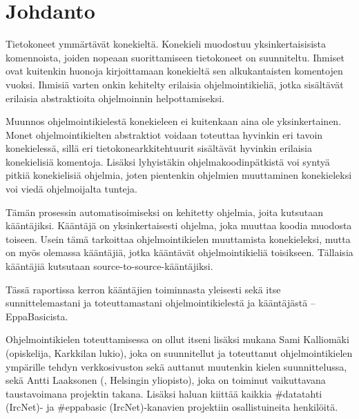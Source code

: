 
\section{Johdanto}
Tietokoneet ymmärtävät konekieltä.
Konekieli muodostuu yksinkertaisisista komennoista,
joiden nopeaan suorittamiseen tietokoneet on suunniteltu.
Ihmiset ovat kuitenkin huonoja kirjoittamaan konekieltä
sen alkukantaisten komentojen vuoksi.
Ihmisiä varten onkin kehitelty erilaisia ohjelmointikieliä,
jotka sisältävät erilaisia abstraktioita ohjelmoinnin helpottamiseksi.

Muunnos ohjelmointikielestä konekieleen ei kuitenkaan aina ole yksinkertainen.
Monet ohjelmointikielten abstraktiot voidaan toteuttaa hyvinkin eri tavoin konekielessä,
sillä eri tietokonearkkitehtuurit sisältävät hyvinkin erilaisia konekielisiä komentoja.
Lisäksi lyhyistäkin ohjelmakoodinpätkistä voi syntyä pitkiä konekielisiä ohjelmia,
joten pientenkin ohjelmien muuttaminen konekieleksi voi viedä ohjelmoijalta tunteja.

Tämän prosessin automatisoimiseksi on kehitetty ohjelmia, joita kutsutaan kääntäjiksi.
Kääntäjä on yksinkertaisesti ohjelma, joka muuttaa koodia muodosta toiseen.
Usein tämä tarkoittaa ohjelmointikielen muuttamista konekieleksi,
mutta on myös olemassa kääntäjiä,
jotka kääntävät ohjelmointikieliä toisikseen.
Tällaisia kääntäjiä kutsutaan source-to-source-kääntäjiksi.

Tässä raportissa kerron kääntäjien toiminnasta yleisesti
sekä itse sunnittelemastani ja toteuttamastani ohjelmointikielestä ja kääntäjästä -- EppaBasicista.

Ohjelmointikielen toteuttamisessa on ollut itseni lisäksi mukana
Sami Kalliomäki (opiskelija, Karkkilan lukio),
joka on suunnitellut ja toteuttanut ohjelmointikielen ympärille tehdyn verkkosivuston
sekä auttanut muutenkin kielen suunnittelussa,
sekä Antti Laaksonen (, Helsingin yliopisto),
joka on toiminut vaikuttavana taustavoimana projektin takana.
Lisäksi haluan kiittää kaikkia \#datatahti (IrcNet)- ja \#eppabasic (IrcNet)-kanavien projektiin osallistuineita henkilöitä.

%
